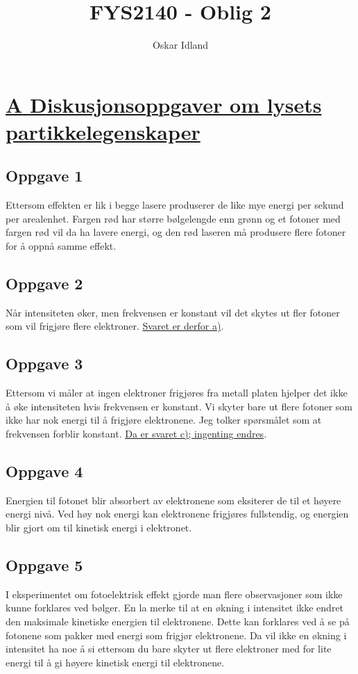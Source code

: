 \documentclass{article}
\author{Oskar Idland}
\title{FYS2140 - Oblig 2}
\date{}
\begin{document}
\maketitle
\newpage

\section*{\underline{A Diskusjonsoppgaver om lysets partikkelegenskaper}}

\subsection*{Oppgave 1}
Ettersom effekten er lik i begge lasere produserer de like mye energi per sekund per arealenhet. Fargen rød har større bølgelengde enn grønn og et fotoner med fargen rød vil da ha lavere energi, og den rød laseren må produsere flere fotoner for å oppnå samme effekt. 

\subsection*{Oppgave 2}
Når intensiteten øker, men frekvensen er konstant vil det skytes ut fler fotoner som vil frigjøre flere elektroner. \underline{Svaret er derfor a)}. 
  
\subsection*{Oppgave 3}
Ettersom vi måler at ingen elektroner frigjøres fra metall platen hjelper det ikke å øke intensiteten hvis frekvensen er konstant. Vi skyter bare ut flere fotoner som ikke har nok energi til å frigjøre elektronene. Jeg tolker spørsmålet som at frekvensen forblir konstant. \underline{Da er svaret c); ingenting endres}.  

\subsection*{Oppgave 4}
Energien til fotonet blir absorbert av elektronene som eksiterer de til et høyere energi nivå. Ved høy nok energi kan elektronene frigjøres fullstendig, og energien blir gjort om til kinetisk energi i elektronet. 


\subsection*{Oppgave 5}
I eksperimentet om fotoelektrisk effekt gjorde man flere observasjoner som ikke kunne forklares ved bølger. En la merke til at en økning i intensitet ikke endret den maksimale kinetiske energien til elektronene. Dette kan forklares ved å se på fotonene som pakker med energi som frigjør elektronene. Da vil ikke en økning i intensitet ha noe å si ettersom du bare skyter ut flere elektroner med for lite energi til å gi høyere kinetisk energi til elektronene. 
\end{document}
